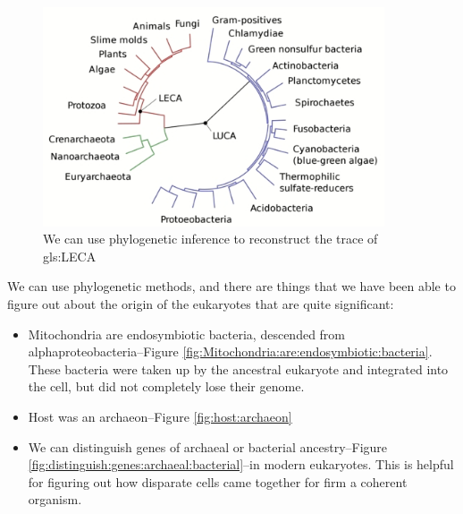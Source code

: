 \documentclass[]{article}
\begin{document}
\begin{figure}[H]
	\caption[We can use phylogenetic inference  to reconstruct the trace of LECA]{We can use phylogenetic inference  to reconstruct the trace of \gls{gls:LECA}}\label{fig:LECA}
	\includegraphics[width=0.9\textwidth]{LECA}
\end{figure}

We can use phylogenetic methods, and there are things that we have been able to figure out about the origin of the eukaryotes that are quite significant:
\begin{itemize}
	\item Mitochondria are endosymbiotic bacteria, descended from alphaproteobacteria--Figure \ref{fig:Mitochondria:are:endosymbiotic:bacteria}. These bacteria were taken up by the ancestral eukaryote and integrated into the cell, but did not completely lose their genome.
	\item Host was an archaeon--Figure \ref{fig:host:archaeon}
	\item We can distinguish genes of archaeal or 	bacterial ancestry--Figure \ref{fig:distinguish:genes:archaeal:bacterial}--in modern eukaryotes. This is helpful for figuring out how disparate cells came together for firm a coherent organism.
\end{itemize}
\end{document}
